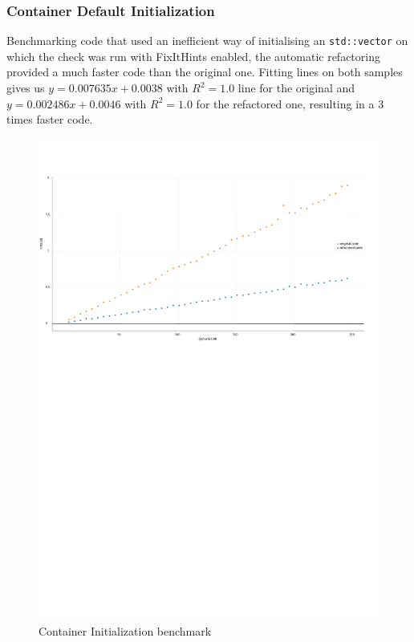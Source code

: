 \subsubsection{Container Default Initialization}
\par Benchmarking code that used an inefficient way of initialising an \verb|std::vector| on which the check was run with FixItHints enabled, the automatic refactoring provided a much faster code than the original one. Fitting lines on both samples gives us $y=0.007635x+0.0038$ with $R^2=1.0$ line for the original and $y=0.002486x+0.0046$ with $R^2=1.0$ for the refactored one, resulting in a 3 times faster code.
\begin{figure}[H]
	\caption{Container Initialization benchmark}
	\includegraphics[scale=0.7]{images/container_init_performance.pdf}
\end{figure}
